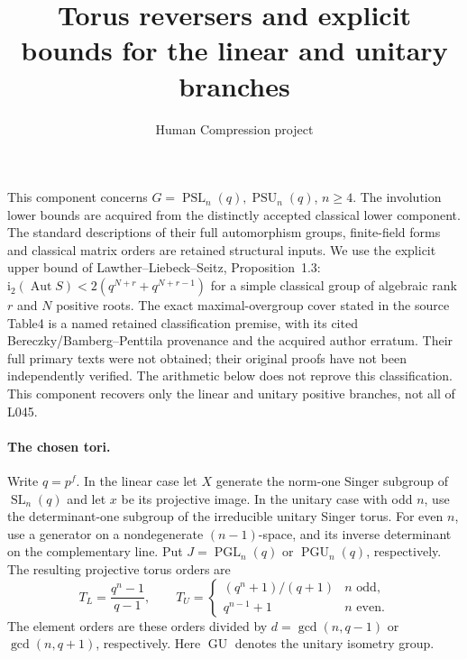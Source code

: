 \documentclass[10pt]{article}
\title{Torus reversers and explicit bounds for the linear and unitary branches}
\author{Human Compression project}\date{}
\newcommand{\ii}{\mathrm i_2}\newcommand{\F}{\mathbb F}\newcommand{\GL}{\operatorname{GL}}\newcommand{\GU}{\operatorname{GU}}\newcommand{\Sp}{\operatorname{Sp}}\newcommand{\PGO}{\operatorname{PGO}}
\newcommand{\PGL}{\operatorname{PGL}}\newcommand{\PGU}{\operatorname{PGU}}\newcommand{\PSL}{\operatorname{PSL}}\newcommand{\PSU}{\operatorname{PSU}}
\begin{document}
\maketitle
\noindent This component concerns $G=\PSL_n(q),\PSU_n(q)$, $n\ge4$.
The involution lower bounds are acquired from the distinctly accepted classical
lower component. The standard descriptions of their full automorphism groups,
finite-field forms and classical matrix orders are retained structural inputs.
We use the explicit upper bound of Lawther--Liebeck--Seitz, Proposition~1.3:
$\ii(\operatorname{Aut}S)<2(q^{N+r}+q^{N+r-1})$ for a simple classical group
of algebraic rank $r$ and $N$ positive roots. The exact maximal-overgroup cover stated in the source Table4 is a named
retained classification premise, with its cited Bereczky/Bamberg--Penttila
provenance and the acquired author erratum. Their full primary texts were
not obtained; their original proofs have not been independently verified.
The arithmetic below does not reprove this classification. This component
recovers only the linear and unitary positive branches, not all of L045.

\paragraph{The chosen tori.}
Write $q=p^f$. In the linear case let $X$ generate the norm-one Singer subgroup
of $\operatorname{SL}_n(q)$ and let $x$ be its projective image. In the unitary
case with odd $n$, use the determinant-one subgroup of the irreducible unitary
Singer torus. For even $n$, use a generator on a nondegenerate $(n-1)$-space,
and its inverse determinant on the complementary line. Put $J=\PGL_n(q)$ or
$\PGU_n(q)$, respectively. The resulting projective torus orders are
\[
 T_L=\frac{q^n-1}{q-1},\qquad
 T_U=\begin{cases}(q^n+1)/(q+1)&n\text{ odd},\\q^{n-1}+1&n\text{ even}.
 \end{cases}
\]
The element orders are these orders divided by $d=\gcd(n,q-1)$ or
$\gcd(n,q+1)$, respectively. Here $\GU$ denotes the unitary isometry group.
\end{document}

